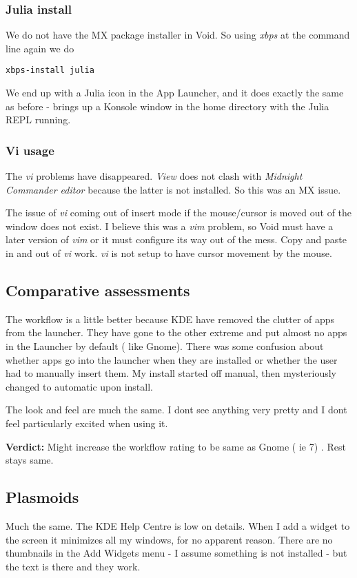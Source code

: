 \documentclass{article}  %
\begin{document}
\subsubsection{Julia install}
We do not have the MX package installer in Void. So using {\em xbps} at the command line  again we do
\begin{verbatim}
xbps-install julia
\end{verbatim}
We end up with a Julia icon in the App Launcher, and it does exactly the same as before - brings up a Konsole window in the home directory with the Julia REPL running.

\subsubsection{Vi usage}
The {\em vi} problems have disappeared. {\em View} does not clash with {\em Midnight Commander editor} because the latter is not installed. So this was an MX issue.

The issue of {\em vi} coming out of insert mode if the mouse/cursor is moved out of the window does not exist. I believe this was a {\em vim} problem, so Void must have a later version of {\em vim} or it must configure its way out of the mess. Copy and paste in and out of {\em vi} work. {\em vi} is not setup to have cursor movement by the mouse.

\subsection{Comparative assessments}
The workflow is a little better because KDE have removed the clutter of apps from the launcher. They have gone to the other extreme and put almost no apps in the Launcher by default ( like Gnome). There was some confusion about whether apps go into the launcher when they are installed or whether the user had to manually insert them. My install started off manual, then mysteriously changed to automatic upon install.

The look and feel are much the same. I dont see anything very pretty and I dont feel particularly excited when using it. 

{\bf Verdict:} Might increase the workflow rating to be same as Gnome ( ie 7) . Rest stays same.

\subsection{Plasmoids}
 Much the same. The KDE Help Centre is low on details. When I add a widget to the screen it minimizes all my windows, for no apparent reason. There are no thumbnails in the Add Widgets menu - I assume something is not installed - but the text is there and they work. 
\end{document}
